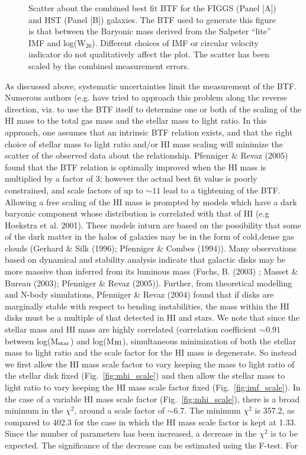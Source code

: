 \documentclass[useAMS,usenatbib]{mn2e}
\begin{document}
\begin{figure}
\caption{Scatter about the combined best fit BTF for the FIGGS (Panel [A]) and HST (Panel [B]) galaxies. The BTF used to generate this figure is that between the Baryonic mass derived from the Salpeter ``lite'' IMF and log(W$_{20}$). Different choices of IMF or circular velocity indicator do not qualitatively affect the plot. The scatter has been scaled by the combined measurement errors.}
\label{fig:btf_dev}
\end{figure}

As discussed above, systematic uncertainties limit the measurement of the BTF. Numerous authors (e.g. \cite{pfenniger05,mg05} have tried to approach this problem along the reverse direction, viz. to use the BTF itself to determine one or both of the scaling of the HI mass to the total gas mass and the stellar mass to light ratio. 
In this approach, one assumes that an intrinsic BTF relation exists, and that the right choice of 
stellar mass to light ratio and/or HI mass scaling will minimize the scatter of the observed 
data about the relationship. Pfenniger \& Revaz (2005)  found that the BTF
relation is optimally improved when the HI mass is multiplied
by a factor of 3; however the actual best fit value is poorly
constrained, and scale factors of up to $\sim 11$ lead to a
tightening of the BTF. Allowing a free scaling of the HI mass is
prompted by models  which have a dark baryonic component whose
distribution is correlated with that of HI (e.g Hoekstra et al. 2001).
These models inturn are based on the possibility
that some of the dark matter in the halos of galaxies may be in the
form of cold,dense gas clouds (Gerhard \& Silk (1996);
Pfenniger \& Combes (1994)). Many observations based on
dynamical and stability analysis indicate that galactic disks may be
more massive than inferred from its luminous mass (Fuchs, B. (2003)
; Masset \& Bureau (2003); Pfenniger \& Revaz (2005)).
Further, from theoretical modelling and N-body
simulations, Pfenniger \& Revaz (2004) found that
if disks are marginally stable with respect to bending instabilities,
the mass within the HI disks must be a multiple of that detected
in HI and stars.
We note that since the stellar mass and HI mass are highly 
correlated (correlation coefficient $\sim 0.91$ between log(M$_{\rm star}$) and log(M$_{\rm HI}$), simultaneous minimization of both the stellar mass to light ratio and the scale factor for the HI mass is degenerate. So instead we first allow the HI mass scale factor to vary keeping the mass to light ratio of the stellar disk fixed (Fig.~\ref{fig:mhi_scale}) and then allow the stellar mass to light ratio to vary keeping the HI mass scale factor fixed (Fig.~\ref{fig:imf_scale}). In the case of a variable HI mass scale factor (Fig.~\ref{fig:mhi_scale}), there is a broad minimum in the $\chi^2$, around a scale factor of $\sim 6.7$. The minimum $\chi^2$ is 357.2, as compared to 402.3 for the case in which the HI mass scale factor is kept at 1.33. Since the number of parameters has been increased, a decrease in the $\chi^2$ is to be expected. The significance of the decrease can be estimated using the F-test. For
\end{document}
